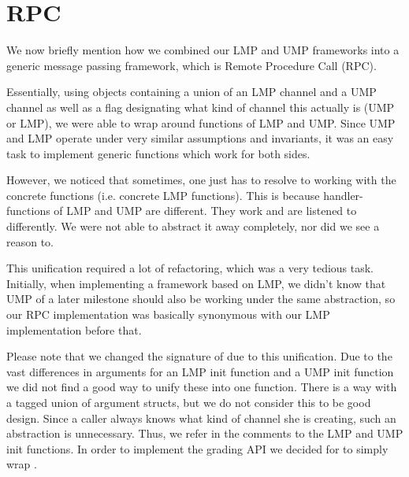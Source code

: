 \chapter{RPC}

We now briefly mention how we combined our LMP and UMP frameworks into a generic message passing framework, which
is Remote Procedure Call (RPC).

Essentially, using objects containing a union of an LMP channel and a UMP channel as well as a flag designating what kind of
channel this actually is (UMP or LMP), we were able to wrap around functions of LMP and UMP. Since UMP and LMP operate under 
very similar assumptions and invariants, it was an easy task to implement generic functions which work for both sides.

However, we noticed that sometimes, one just has to resolve to working with the concrete functions (i.e. concrete LMP functions).
This is because handler-functions of LMP and UMP are different. They work and are listened to differently.
We were not able to abstract it away completely, nor did we see a reason to.

This unification required a lot of refactoring, which was a very tedious task. Initially, when implementing a framework
based on LMP, we didn't know that UMP of a later milestone should also be working under the same abstraction,
so our RPC implementation was basically synonymous with our LMP implementation before that.

Please note that we changed the signature of  due to this unification. Due to the vast differences
in arguments for an LMP init function and a UMP init function we did not find a good way to unify these into one function.
There is a way with a tagged union of argument structs, but we do not consider this to be good design. Since a caller always
knows what kind of channel she is creating, such an abstraction is unnecessary. Thus, we refer in the comments to the
LMP and UMP init functions. In order to implement the grading API we decided for  to simply wrap
.